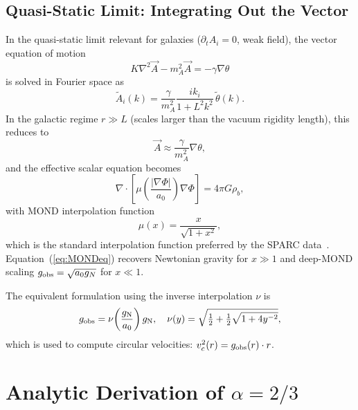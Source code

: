 \documentclass[aps,prd,twocolumn,showpacs,superscriptaddress]{revtex4-2}
\newcommand{\aO}{a_0}
\newcommand{\gN}{g_{\rm N}}
\newcommand{\gobs}{g_{\rm obs}}
\begin{document}
\subsection{Quasi-Static Limit: Integrating Out the Vector}

In the quasi-static limit relevant for galaxies
($\partial_t A_i = 0$, weak field), the vector equation of motion
\begin{equation}
  K\nabla^2 \vec{A} - m_A^2\vec{A} = -\gamma\nabla\theta
\end{equation}
is solved in Fourier space as
\begin{equation}
  \tilde{A}_i(k) = \frac{\gamma}{m_A^2}
    \frac{ik_i}{1+L^2 k^2}\,\tilde\theta(k).
\end{equation}
In the galactic regime $r \gg L$ (scales larger than the vacuum
rigidity length), this reduces to
\begin{equation}
  \vec{A} \approx \frac{\gamma}{m_A^2}\nabla\theta,
  \label{eq:Alocal}
\end{equation}
and the effective scalar equation becomes
\begin{equation}
  \nabla\cdot\!\left[\mu\!\left(\frac{|\nabla\Phi|}{\aO}\right)\nabla\Phi\right]
  = 4\pi G\rho_b,
  \label{eq:MONDeq}
\end{equation}
with MOND interpolation function
\begin{equation}
  \boxed{\mu(x) = \frac{x}{\sqrt{1+x^2}},}
  \label{eq:mu}
\end{equation}
which is the standard interpolation function preferred by the SPARC
data~\cite{Lelli2017}.
Equation~(\ref{eq:MONDeq}) recovers Newtonian gravity for $x\gg1$
and deep-MOND scaling $g_{\rm obs} = \sqrt{\aO g_N}$ for $x\ll1$.

The equivalent formulation using the inverse interpolation $\nu$ is
\begin{equation}
  \gobs = \nu\!\left(\frac{\gN}{\aO}\right)\gN,
  \quad
  \nu(y) = \sqrt{\tfrac{1}{2}+\tfrac{1}{2}\sqrt{1+4y^{-2}}},
  \label{eq:nu}
\end{equation}
which is used to compute circular velocities:
$v_c^2(r) = \gobs(r)\cdot r$.

\section{Analytic Derivation of \texorpdfstring{$\alpha=2/3$}{alpha=2/3}}
\label{sec:alpha}
\end{document}
